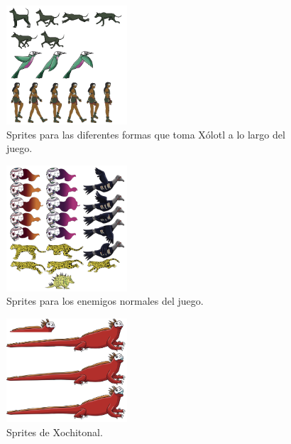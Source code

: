 \begin{figure}[H]
    \centering
    \includegraphics[width=0.40\textwidth]{Anexos/disenios/Xolotl.png}
    \caption{Sprites para las diferentes formas que toma Xólotl a lo largo del juego.}
    \label{fig:Xolotl}
\end{figure}

\begin{figure}[H]
    \centering
    \includegraphics[width=0.40\textwidth]{Anexos/disenios/EnemigosNormales.png}
    \caption{Sprites para los enemigos normales del juego.}
    \label{fig:NorlmalEnemy}
\end{figure}

\begin{figure}[H]
    \centering
    \includegraphics[width=0.40\textwidth]{Anexos/disenios/Xochitonal.png}
    \caption{Sprites de Xochitonal.}
    \label{fig:Xochitonal}
\end{figure}

